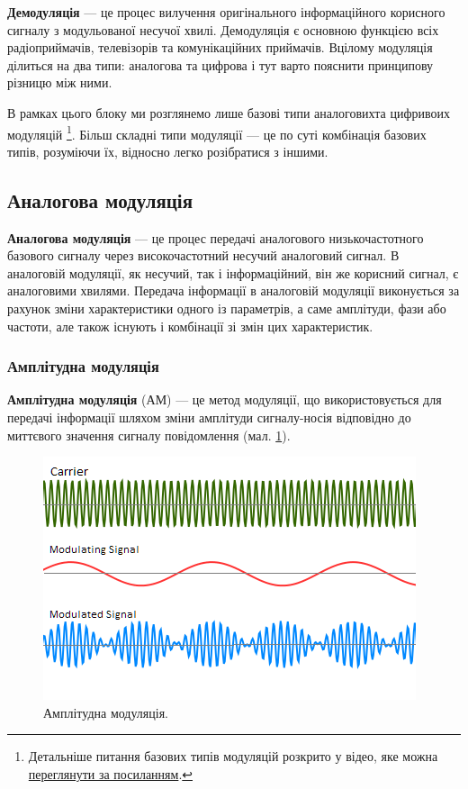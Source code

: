 \documentclass{article}
\begin{document}
\textbf{Демодуляція} --- це процес вилучення оригінального інформаційного корисного сигналу з модульованої несучої хвилі. Демодуляція є основною функцією всіх радіоприймачів, телевізорів та комунікаційних приймачів. 
Вцілому модуляція ділиться на два типи: аналогова та цифрова і тут варто пояснити принципову різницю між ними.

В рамках цього блоку ми розглянемо лише базові типи аналоговихта цифривоих модуляцій \footnote{Детальніше питання базових типів модуляцій розкрито у відео, яке можна \href{https://www.youtube.com/watch?v=gfz1FbIOMbs}{переглянути за посиланням}.}. Більш складні типи модуляції --- це по суті комбінація базових типів, розуміючи їх, відносно легко розібратися з іншими.


\subsection{Аналогова модуляція}
\textbf{Аналогова модуляція} --- це процес передачі аналогового низькочастотного базового сигналу через високочастотний несучий аналоговий сигнал. В аналоговій модуляції, як несучий, так і інформаційний, він же корисний сигнал, є аналоговими хвилями. Передача інформації в аналоговій модуляції виконується за рахунок зміни характеристики одного із параметрів, а саме амплітуди, фази або частоти, але також існують і комбінації зі змін цих характеристик.

\subsubsection{Амплітудна модуляція}
\textbf{Амплітудна модуляція} (АМ) --- це метод модуляції, що використовується для передачі інформації шляхом зміни амплітуди сигналу-носія відповідно до миттєвого значення сигналу повідомлення (мал. \ref{fig:am}).

\begin{figure}[h!]
\centering
\includegraphics[width=0.6\linewidth]{images/am.png}
\caption{\label{fig:am}Амплітудна модуляція.}
\end{figure}
\end{document}
